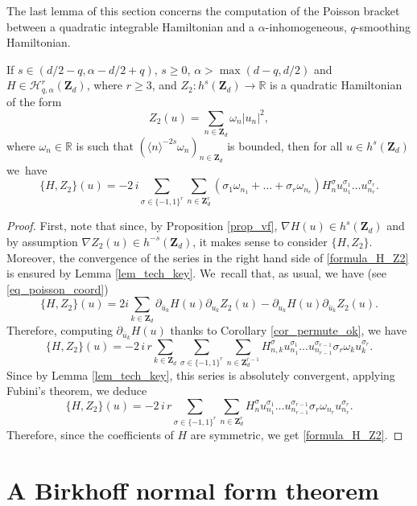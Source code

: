 The last lemma of this section concerns the computation of the Poisson bracket between a quadratic integrable Hamiltonian and a $\alpha$-inhomogeneous, $q$-smoothing Hamiltonian.
\begin{lemma}
\label{lem_Z2_vs_H}
If $s\in (d/2-q, \alpha-d/2+q)$, $s\geq 0$, $\alpha >\max(d-q,d/2)$ and $ H\in \mathscr{H}_{q,\alpha}^r(\mathbf{Z}_d)$, where $r\geq 3$, and
$Z_2: h^s(\mathbf{Z}_d) \to \mathbb{R}$ is a quadratic Hamiltonian of the form
\[
Z_2(u) = \sum_{n\in \mathbf{Z}_d} \omega_n |u_n|^2,
\]
where $\omega_n \in \mathbb{R}$ is such that $(\langle n \rangle^{-2s} \omega_n)_{n\in \mathbf{Z}_d}$ is bounded, then for all $u\in h^s(\mathbf{Z}_d)$ we~have%
\begin{equation}
\label{formula_H_Z2}
\{ H, Z_2\}(u) = -2 \, i \sum_{\sigma \in \{-1,1\}^{r}} \sum_{n\in \mathbf{Z}_d^r } (\sigma_1 \omega_{n_1} + \dots + \sigma_r \omega_{n_r}) H_{n}^{\sigma} u_{n_1}^{\sigma_1} \dots u_{n_r}^{\sigma_r}.
\end{equation}
\end{lemma}
\begin{proof} First, note that since, by Proposition \ref{prop_vf}, $\nabla H(u) \in h^s(\mathbf{Z}_d)$ and by assump\-tion $\nabla Z_2(u) \in h^{-s}(\mathbf{Z}_d)$, it makes sense to consider $\{ H, Z_2\}$. Moreover, the convergence of the series in the right hand side of \eqref{formula_H_Z2} is ensured by Lemma \ref{lem_tech_key}.
We~recall that, as usual, we have (see \eqref{eq_poisson_coord})
\[
\{ H, Z_2\}(u) = 2i \sum_{k\in \mathbf{Z}_d} \partial_{\bar{u}_k}H(u) \partial_{u_k} Z_2(u) - \partial_{u_k}H(u) \partial_{\bar{u}_k} Z_2(u).
\]
Therefore, computing $\partial_{\bar{u}_k}H(u)$ thanks to Corollary \ref{cor_permute_ok}, we have
\[
\{ H, Z_2\}(u) = -2 \, i \,r \sum_{k\in \mathbf{Z}_d} \sum_{\sigma \in \{-1,1\}^{r}} \sum_{n\in \mathbf{Z}_d^{r-1} } H_{n,k}^{\sigma} u_{n_1}^{\sigma_1} \dots u_{n_{r-1}}^{\sigma_{r-1}} \sigma_r \omega_k u_k^{\sigma_r}.
\]
Since by Lemma \ref{lem_tech_key}, this series is absolutely convergent, applying Fubini's theorem, we deduce
\[
\{ H, Z_2\}(u) = -2 \, i\,r \sum_{\sigma \in \{-1,1\}^{r}} \sum_{n\in \mathbf{Z}_d^r } H_{n}^{\sigma} u_{n_1}^{\sigma_1} \dots u_{n_{r-1}}^{\sigma_{r-1}} \sigma_r \omega_{n_r} u_{n_r}^{\sigma_r}.
\]
Therefore, since the coefficients of $H$ are symmetric, we get \eqref{formula_H_Z2}.
\end{proof}

\section{A Birkhoff normal form theorem}

